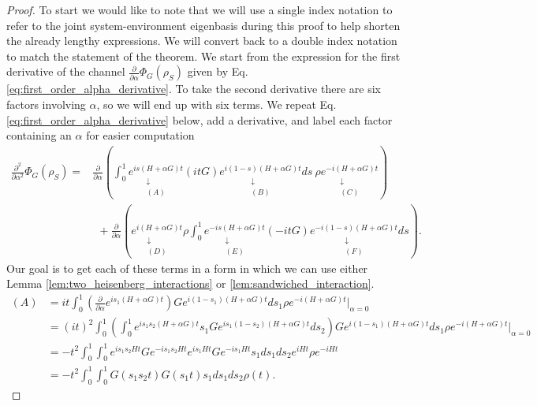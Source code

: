 \documentclass[
 amsmath,amssymb,
 aps,
onecolumn, 
nofootinbib]{revtex4-2}
\newcommand{\parens}[1]{\left( #1 \right)}
\begin{document}
\secondOrderChannelHaar*
\begin{proof}
To start we would like to note that we will use a single index notation to refer to the joint system-environment eigenbasis during this proof to help shorten the already lengthy expressions. We will convert back to a double index notation to match the statement of the theorem. We start from the expression for the first derivative of the channel $\frac{\partial}{\partial \alpha} \Phi_G(\rho_S)$ given by Eq. \eqref{eq:first_order_alpha_derivative}. To take the second derivative there are six factors involving $\alpha$, so we will end up with six terms. We repeat Eq. \eqref{eq:first_order_alpha_derivative} below, add a derivative, and label each factor containing an $\alpha$ for easier computation
\begin{align}
    \frac{\partial^2}{\partial \alpha^2} \Phi_G(\rho_S) =& \frac{\partial}{\partial \alpha} \parens{\int_{0}^{1} \underset{\substack{\downarrow \\ (A)}}{e^{i s (H+\alpha G)t}} (i t G) \underset{\substack{\downarrow \\ (B)}}{e^{i (1-s) (H+\alpha G)t}} ds ~ \rho \underset{\substack{\downarrow \\ (C)}}{e^{-i(H+\alpha G)t}} } \nonumber \\
    &~ ~+\frac{\partial}{\partial \alpha} \parens{ \underset{\substack{\downarrow \\ (D)} }{e^{i(H+\alpha G)t}} \rho \int_{0}^1 \underset{\substack{\downarrow \\ (E)} }{e^{-i s (H+\alpha G) t} } (- i t G) \underset{\substack{\downarrow \\ (F)}}{e^{-i (1-s) (H+\alpha G)t}} ds }. \label{eq:second_derivative_labels}
\end{align}
Our goal is to get each of these terms in a form in which we can use either Lemma \ref{lem:two_heisenberg_interactions} or \ref{lem:sandwiched_interaction}. 
\begin{align}
    (A) &=i t\int_0^1 \parens{\frac{\partial}{\partial \alpha} e^{i s_1 (H+ \alpha G)t}} G e^{i(1-s_1)(H+\alpha G)t} ds_1 \rho e^{-i (H+\alpha G)t} \bigg|_{\alpha=0} \\
    &= (it)^2 \int_0^1 \parens{\int_0^1 e^{i s_1 s_2 (H+\alpha G)t} s_1 G e^{i s_1 (1-s_2) (H+\alpha G)t} ds_2} G e^{i(1-s_1) (H+\alpha G)t} ds_1 \rho e^{-i(H+\alpha G) t} \bigg|_{\alpha=0} \label{eq:second_order_deriv_intermediate_a}\\
    &= -t^2 \int_0^1 \int_0^1 e^{i s_1 s_2 H t} G e^{-i s_1 s_2 H t} e^{i s_1 H t} G e^{-i s_1 H t} s_1 ds_1 ds_2 e^{i H t} \rho e^{-i H t} \\
    &= -t^2 \int_0^1 \int_0^1 G(s_1 s_2 t) G(s_1 t) s_1 ds_1 ds_2 \rho(t). \label{eq:second_deriv_alpha_first_term}
\end{align}


\end{proof}
\end{document}
